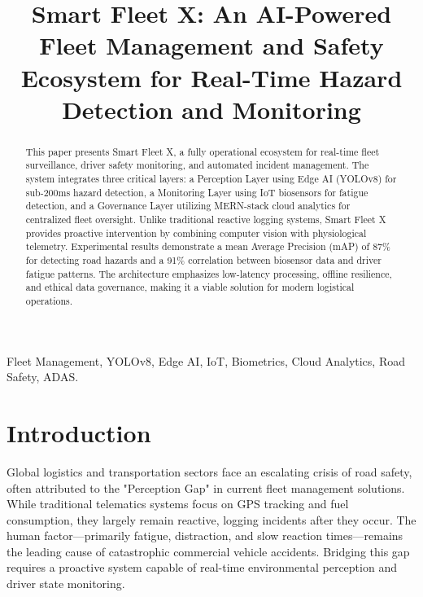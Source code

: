 \documentclass[conference]{IEEEtran}
\begin{document}
\title{Smart Fleet X: An AI-Powered Fleet Management and Safety Ecosystem for Real-Time Hazard Detection and Monitoring}

\author{
}

\maketitle

\begin{abstract}
This paper presents Smart Fleet X, a fully operational ecosystem for real-time fleet surveillance, driver safety monitoring, and automated incident management. The system integrates three critical layers: a Perception Layer using Edge AI (YOLOv8) for sub-200ms hazard detection, a Monitoring Layer using IoT biosensors for fatigue detection, and a Governance Layer utilizing MERN-stack cloud analytics for centralized fleet oversight. Unlike traditional reactive logging systems, Smart Fleet X provides proactive intervention by combining computer vision with physiological telemetry. Experimental results demonstrate a mean Average Precision (mAP) of 87\% for detecting road hazards and a 91\% correlation between biosensor data and driver fatigue patterns. The architecture emphasizes low-latency processing, offline resilience, and ethical data governance, making it a viable solution for modern logistical operations.
\end{abstract}

\begin{IEEEkeywords}
Fleet Management, YOLOv8, Edge AI, IoT, Biometrics, Cloud Analytics, Road Safety, ADAS.
\end{IEEEkeywords}

\section{Introduction}
Global logistics and transportation sectors face an escalating crisis of road safety, often attributed to the "Perception Gap" in current fleet management solutions. While traditional telematics systems focus on GPS tracking and fuel consumption, they largely remain reactive, logging incidents after they occur. The human factor—primarily fatigue, distraction, and slow reaction times—remains the leading cause of catastrophic commercial vehicle accidents. Bridging this gap requires a proactive system capable of real-time environmental perception and driver state monitoring.
\end{document}
